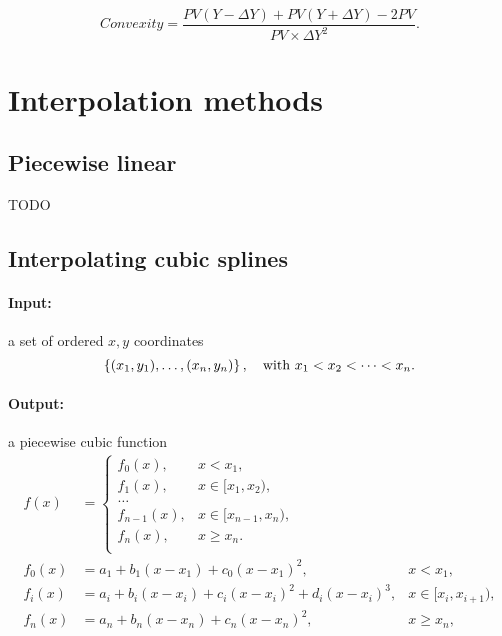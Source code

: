 \begin{equation}
  Convexity  
    = \frac{PV(Y-\Delta Y) + PV(Y+\Delta Y) - 2PV}{PV \times \Delta Y^2}.
\end{equation}


\section{Interpolation methods}

\subsection{Piecewise linear}

TODO



\subsection{Interpolating cubic splines}

\paragraph{Input:} a set of ordered $x, y$ coordinates
\begin{equation*}
\left\{ (x_1,y_1),\dots,(x_n,y_n) \right\},\quad \text{with } x_1 < x_2 < \dots < x_n.
\end{equation*}
\paragraph{Output:} a piecewise cubic function
\begin{equation}
\begin{aligned}
    f(x) & = \begin{cases}
            f_0(x), & x<x_1,\\
            f_1(x), & x\in[x_1,x_2),\\
            \dots  \\
            f_{n-1}(x), & x\in[x_{n-1},x_n), \\
            f_{n}(x), & x\geq x_n. \\
            \end{cases} \\
            f_0(x)  & = a_1 + b_1 (x-x_1) + c_0 (x-x_1)^2, & x<x_1,\\
            f_i(x)  & = a_i + b_i (x-x_i) + c_i (x-x_i)^2 + d_i (x-x_i)^3, &
            x\in[x_i, x_{i+1}),\\
                f_n(x)  & = a_n + b_n (x-x_n) + c_n (x-x_n)^2, & x\geq x_n,
\end{aligned}
\end{equation}

